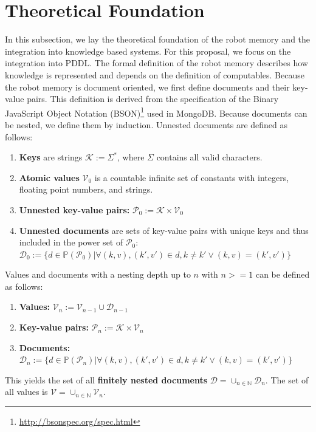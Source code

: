 \section{Theoretical Foundation}
\label{sec:formalism}
In this subsection, we lay the theoretical foundation of the robot
memory and the integration into knowledge based systems. For
this proposal, we focus on the integration into PDDL. 
The formal definition of the robot memory describes how knowledge is
represented and depends on the definition of computables. Because the
robot memory is document oriented, we first define documents and their
key-value pairs. This definition is derived from the specification of
the Binary JavaScript Object Notation
(BSON)\footnote{\url{http://bsonspec.org/spec.html}} used in MongoDB.
Because documents can be nested, we define them by induction. Unnested
documents are defined as follows:
\begin{enumerate}
\item \textbf{Keys} are strings $\mathcal{K} := \Sigma^*$, where
  $\Sigma$ contains all valid characters.
\item  \textbf{Atomic values} $\mathcal{V}_0$ is a countable infinite set of constants with
  integers, floating point numbers, and strings.
\item \textbf{Unnested key-value pairs:} $\mathcal{P}_0:=\mathcal{K}\times\mathcal{V}_0$
\item \textbf{Unnested documents} are sets of key-value pairs with
  unique keys and thus included in the power set of $\mathcal{P}_0$:\\
  $\mathcal{D}_0:=\{
  d\in\mathbb{P}(\mathcal{P}_0)|
  \forall (k,v),(k',v')\in d , k\neq k' \vee (k,v)=(k',v')
  \}$
\end{enumerate}
Values and documents with a nesting depth up to $n$ with $n>=1$ can be
defined as follows:
\begin{enumerate}
\item  \textbf{Values:} $\mathcal{V}_n := \mathcal{V}_{n-1} \cup \mathcal{D}_{n-1}$
\item \textbf{Key-value pairs:} $\mathcal{P}_n:=\mathcal{K}\times\mathcal{V}_n$
\item \textbf{Documents:}
  $\mathcal{D}_n:=\{
  d\in\mathbb{P}(\mathcal{P}_n)|
  \forall (k,v),(k',v')\in d , k\neq k' \vee (k,v)=(k',v')
  \}$
\end{enumerate}
This yields the set of all \textbf{finitely nested documents}
$\mathcal{D}=\cup_{n\in\mathbb{N}}\mathcal{D}_n$.
The set of all values is $\mathcal{V}=\cup_{n\in\mathbb{N}}\mathcal{V}_n$.

